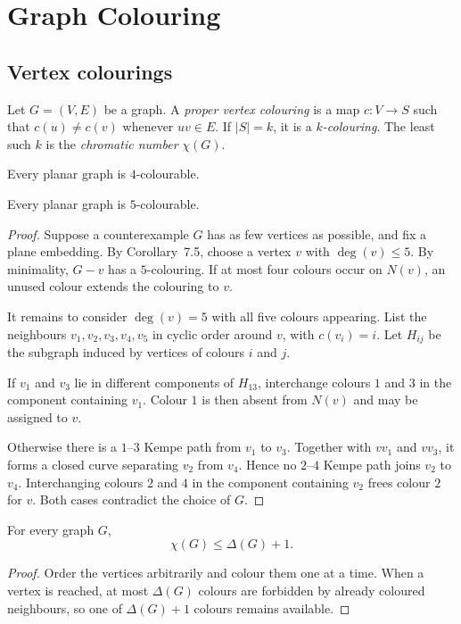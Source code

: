 \chapter{Graph Colouring}

\section{Vertex colourings}

\begin{notedefinition}
Let $G=(V,E)$ be a graph.  A \emph{proper vertex colouring} is a map
$c\colon V\to S$ such that $c(u)\ne c(v)$ whenever $uv\in E$.  If
$|S|=k$, it is a \emph{$k$-colouring}.  The least such $k$ is the
\emph{chromatic number} $\chi(G)$.
\end{notedefinition}

\begin{notetheorem}
Every planar graph is $4$-colourable.
\end{notetheorem}

\begin{notetheorem}
Every planar graph is $5$-colourable.
\end{notetheorem}
\begin{proof}
Suppose a counterexample $G$ has as few vertices as possible, and fix a plane
embedding.  By Corollary~7.5, choose a vertex $v$ with $\deg(v)\le5$.  By
minimality, $G-v$ has a $5$-colouring.  If at most four colours occur on
$N(v)$, an unused colour extends the colouring to $v$.

It remains to consider $\deg(v)=5$ with all five colours appearing.  List the
neighbours $v_1,v_2,v_3,v_4,v_5$ in cyclic order around $v$, with
$c(v_i)=i$.  Let $H_{ij}$ be the subgraph induced by vertices of colours $i$
and $j$.

If $v_1$ and $v_3$ lie in different components of $H_{13}$, interchange
colours $1$ and $3$ in the component containing $v_1$.  Colour $1$ is then
absent from $N(v)$ and may be assigned to $v$.

Otherwise there is a $1$--$3$ Kempe path from $v_1$ to $v_3$.  Together with
$v v_1$ and $v v_3$, it forms a closed curve separating $v_2$ from $v_4$.
Hence no $2$--$4$ Kempe path joins $v_2$ to $v_4$.  Interchanging colours
$2$ and $4$ in the component containing $v_2$ frees colour $2$ for $v$.
Both cases contradict the choice of $G$.
\end{proof}
\begin{notetheorem}
For every graph $G$,
\[
  \chi(G)\le\Delta(G)+1.
\]
\end{notetheorem}
\begin{proof}
Order the vertices arbitrarily and colour them one at a time.  When a vertex
is reached, at most $\Delta(G)$ colours are forbidden by already coloured
neighbours, so one of $\Delta(G)+1$ colours remains available.
\end{proof}

